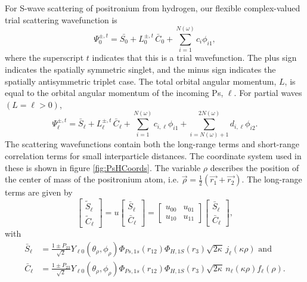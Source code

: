 \documentclass[preprint,showpacs,preprintnumbers,amsmath,amssymb]{revtex4}
\begin{document}
For S-wave scattering of positronium from hydrogen, our flexible complex-valued trial scattering wavefunction is
\begin{equation}
\Psi_0^{\pm,t} = \bar{S_0} + L_0^{\pm,t} \, \bar{C}_0 + \sum_{i=1}^{N(\omega)} c_i \phi_{i1},
\label{eq:TrialWave}
\end{equation}
where the superscript $t$ indicates that this is a trial wavefunction. The plus sign indicates the spatially symmetric singlet, and the minus sign indicates the spatially antisymmetric triplet case. The total orbital angular momentum, $L$, is equal to the orbital angular momentum of the incoming Ps, $\ell$. For partial waves $(L = \ell > 0)$,
\begin{equation}
\Psi_\ell^{\pm,t} = \bar{S}_\ell + L^{\pm,t}_\ell \, \bar{C}_\ell + \sum_{i=1}^{N(\omega)} c_{i,\ell} \phi_{i1} + \sum_{i=N(\omega)+1}^{2N(\omega)} d_{i,\ell} \phi_{i2}.
\label{eq:TrialWaveHigher}
\end{equation}
The scattering wavefunctions contain both the long-range terms and short-range correlation terms for small interparticle distances. The coordinate system used in these is shown in figure \ref{fig:PsHCoords}. The variable $\rho$ describes the position of the center of mass of the positronium atom, i.e. $\vec{\rho} = \frac{1}{2}\left(\vec{r_1} + \vec{r_2}\right)$. The long-range terms are given by
\begin{equation}
\label{eq:SCPhiDef}
\begin{bmatrix}
\widetilde{S}_\ell \\ \widetilde{C}_\ell
\end{bmatrix} = u  \begin{bmatrix}
\bar{S}_\ell \\ \bar{C}_\ell
\end{bmatrix} = \begin{bmatrix}
u_{00} & u_{01} \\  u_{10} & u_{11}
\end{bmatrix}
\begin{bmatrix}
\bar{S}_\ell \\ \bar{C}_\ell
\end{bmatrix}, 
\end{equation}
with
\begin{subequations}
\label{eq:SCBarPhiDef}
\begin{align}
\bar{S}_\ell &= \frac{1\pm P_{23}}{\sqrt{2}}Y_{\ell 0}(\theta_\rho,\phi_\rho)\Phi_{Ps,1s}\left(r_{12}\right) \Phi_{H,1S}\left(r_3\right) \sqrt{2\kappa} \,j_\ell\left(\kappa\rho\right) \text{ and} \label{eq:SBar} \\
\bar{C}_\ell &= \frac{1\pm P_{23}}{\sqrt{2}}Y_{\ell 0}(\theta_\rho,\phi_\rho)\Phi_{Ps,1s}\left(r_{12}\right) \Phi_{H,1S}\left(r_3\right) \sqrt{2\kappa} \,n_\ell\left(\kappa\rho\right) f_\ell(\rho). \label{eq:CBar}
\end{align}
\end{subequations}
\end{document}
